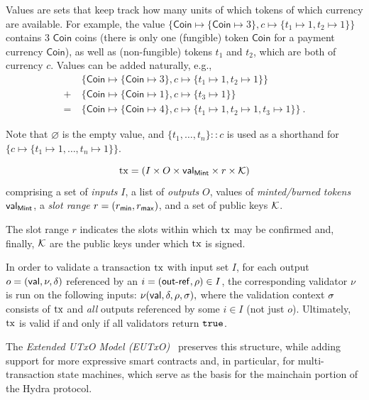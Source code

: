 \begin{definition}[Values]
Values are sets that keep track how many units of which tokens of
which currency are available.  For example, the value
$\{\mathsf{Coin} \mapsto \{\mathsf{Coin} \mapsto 3\}, c \mapsto \{t_1
\mapsto 1, t_2 \mapsto 1\}\}$ contains $3$ $\mathsf{Coin}$ coins
(there is only one (fungible) token $\mathsf{Coin}$ for a payment
currency $\mathsf{Coin}$), as well as (non-fungible) tokens $t_1$ and $t_2$, which
are both of currency $c$.  Values can be added naturally, e.g.,
\begin{align*}
  & \{\mathsf{Coin} \mapsto \{\mathsf{Coin} \mapsto 3\}, c \mapsto \{t_1
    \mapsto 1, t_2 \mapsto 1\}\} \\
  + \ & \{\mathsf{Coin} \mapsto \{\mathsf{Coin} \mapsto 1\}, c \mapsto \{t_3 \mapsto 1\}\} \\
  = \ & \{\mathsf{Coin} \mapsto \{\mathsf{Coin} \mapsto 4\}, c \mapsto \{t_1
        \mapsto 1, t_2 \mapsto 1, t_3 \mapsto 1\}\} \ .
\end{align*}

Note that $\varnothing$ is the empty value, and
\(\{t_1, \ldots, t_n\} :: c\) is used as a shorthand for
\(\{c \mapsto \{t_1 \mapsto 1, \ldots, t_n \mapsto 1\}\}\). 
\end{definition}

\begin{definition}[Transactions]
$$
\mathrm{tx} = (I \times O \times \mathsf{val}_\mathsf{Mint} \times r \times \mathcal K)
$$ 
comprising a set of
\emph{inputs} $I$, a list of \emph{outputs} $O$, values of
\emph{minted/burned tokens} $\mathsf{val}_\mathsf{Mint}$, a \emph{slot range}
\(r = (r_{\mathsf{min}}, r_{\mathsf{max}})\), and a set of public keys $\mathcal K$.

The slot range $r$ indicates the slots within which $\mathrm{tx}$ may be
confirmed and, finally, $\mathcal K$ are the public keys under which
$\mathrm{tx}$ is signed.

In order to validate a transaction $\mathrm{tx}$ with input set $I$, for each
output $o = (\mathsf{val},\nu,\delta)$ referenced by an
$i = (\mathsf{out\textsf{-}{}ref},\rho) \in I$, the corresponding validator $\nu$ is run
on the following inputs:
\(
  \nu(\mathsf{val},\delta,\rho,\sigma),
\)
where the validation context $\sigma$ consists of $\mathrm{tx}$ and \emph{all} outputs
referenced by some $i \in I$ (not just $o$). Ultimately, $\mathrm{tx}$ is
valid if and only if all validators return $\mathtt{true}$.
\end{definition}

\vspace{5mm} The \emph{Extended UTxO Model (EUTxO)}~\cite{eutxo} preserves this structure, while adding support for more expressive smart contracts and, in particular, for multi-transaction state machines, which serve as the basis for the mainchain portion of the Hydra protocol. 

